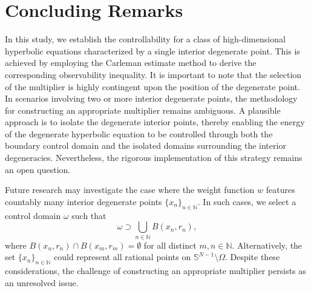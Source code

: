 \documentclass[11pt]{article}
\numberwithin{equation}{section}
\begin{document}
		

\section{Concluding Remarks}\label{Se7}


 In this study, we establish the controllability for a class of high-dimensional hyperbolic equations characterized by a single interior degenerate point. This is achieved by employing the Carleman estimate method to derive the corresponding observability inequality. It is important to note that the selection of the multiplier is highly contingent upon the position of the degenerate point. In scenarios involving two or more interior degenerate points, the methodology for constructing an appropriate multiplier remains ambiguous. A plausible approach is to isolate the degenerate interior points, thereby enabling the energy of the degenerate hyperbolic equation to be controlled through both the boundary control domain and the isolated domains surrounding the interior degeneracies. Nevertheless, the rigorous implementation of this strategy remains an open question.

Future research may investigate the case where the weight function $w$ features countably many interior degenerate points $\{x_n\}_{n \in \mathbb{N}}$. In such cases, we select a control domain $\omega$ such that
\[
\omega \supset \bigcup_{n \in \mathbb{N}} B(x_n, r_n),
\]
where $B(x_n, r_n) \cap B(x_m, r_m) = \emptyset$ for all distinct $m, n \in \mathbb{N}$. Alternatively, the set $\{x_n\}_{n\in\mathbb{N}}$ could represent all rational points on $\mathbb{S}^{N-1}\setminus\Omega$. Despite these considerations, the challenge of constructing an appropriate multiplier persists as an unresolved issue.
\end{document}
